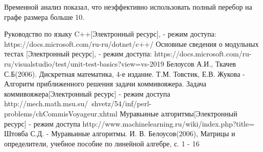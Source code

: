 \documentclass[12pt]{report}
\begin{document}
Временной анализ показал, что неэффективно использовать полный перебор на графе размера больше 10.

 \begin{thebibliography}{3}
Руководство по языку C++[Электронный ресурс], - режим доступа: https://docs.microsoft.com/ru-ru/dotnet/c++/
Основные сведения о модульных тестах [Электронный ресурс], - режим доступа: https://docs.microsoft.com/ru-ru/visualstudio/test/unit-test-basics?view=vs-2019
 Белоусов А.И., Ткачев С.Б(2006). Дискретная математика, 4-е издание.
 Т.М. Товстик, Е.В. Жукова - Алгоритм приближенного решения задачи коммивояжера.
 Задача коммивояжера[Электронный ресурс] - режим доступа http://mech.math.msu.su/~shvetz/54/inf/perl-problems/chCommisVoyageur.xhtml
 Муравьиные алгоритмы[Электронный ресурс] - режим доступа http://www.machinelearning.ru/wiki/index.php?title=%
 Штовба С.Д. - Муравьиные алгоритмы.
 И. В. Белоусов(2006), Матрицы и определители, учебное пособие по линейной алгебре, с. 1 - 16
\end{thebibliography}
\end{document}
